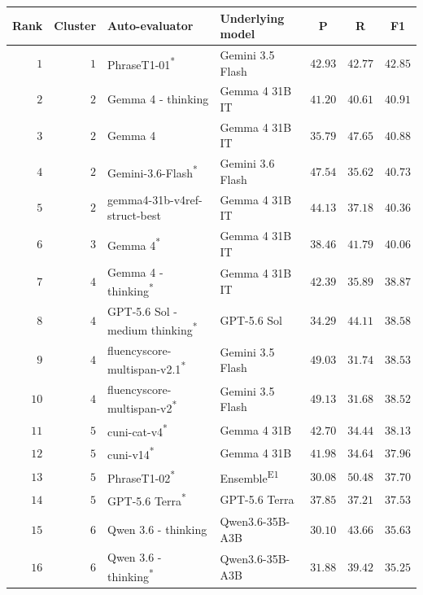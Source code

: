\begin{table}[t]
\centering
\small
\begin{tabular}{rrllrrr}
\toprule
\multicolumn{1}{c}{Rank} & \multicolumn{1}{c}{Cluster} & Auto-evaluator & Underlying model & \multicolumn{1}{c}{P} & \multicolumn{1}{c}{R} & \multicolumn{1}{c}{F1} \\
\midrule
$1$ & $1$ & PhraseT1-01\textsuperscript{*} & Gemini 3.5 Flash & $42.93$ & $42.77$ & $42.85$ \\
\rowcolor{black!15} $2$ & $2$ & Gemma 4 - thinking & Gemma 4 31B IT & $41.20$ & $40.61$ & $40.91$ \\
\rowcolor{black!15} $3$ & $2$ & Gemma 4 & Gemma 4 31B IT & $35.79$ & $47.65$ & $40.88$ \\
\rowcolor{black!15} $4$ & $2$ & Gemini-3.6-Flash\textsuperscript{*} & Gemini 3.6 Flash & $47.54$ & $35.62$ & $40.73$ \\
$5$ & $2$ & gemma4-31b-v4ref-struct-best & Gemma 4 31B IT & $44.13$ & $37.18$ & $40.36$ \\
\rowcolor{black!15} $6$ & $3$ & Gemma 4\textsuperscript{*} & Gemma 4 31B IT & $38.46$ & $41.79$ & $40.06$ \\
\rowcolor{black!15} $7$ & $4$ & Gemma 4 - thinking\textsuperscript{*} & Gemma 4 31B IT & $42.39$ & $35.89$ & $38.87$ \\
\rowcolor{black!15} $8$ & $4$ & GPT-5.6 Sol - medium thinking\textsuperscript{*} & GPT-5.6 Sol & $34.29$ & $44.11$ & $38.58$ \\
$9$ & $4$ & fluencyscore-multispan-v2.1\textsuperscript{*} & Gemini 3.5 Flash & $49.03$ & $31.74$ & $38.53$ \\
$10$ & $4$ & fluencyscore-multispan-v2\textsuperscript{*} & Gemini 3.5 Flash & $49.13$ & $31.68$ & $38.52$ \\
$11$ & $5$ & cuni-cat-v4\textsuperscript{*} & Gemma 4 31B & $42.70$ & $34.44$ & $38.13$ \\
$12$ & $5$ & cuni-v14\textsuperscript{*} & Gemma 4 31B & $41.98$ & $34.64$ & $37.96$ \\
$13$ & $5$ & PhraseT1-02\textsuperscript{*} & Ensemble\textsuperscript{E1} & $30.08$ & $50.48$ & $37.70$ \\
\rowcolor{black!15} $14$ & $5$ & GPT-5.6 Terra\textsuperscript{*} & GPT-5.6 Terra & $37.85$ & $37.21$ & $37.53$ \\
\rowcolor{black!15} $15$ & $6$ & Qwen 3.6 - thinking & Qwen3.6-35B-A3B & $30.10$ & $43.66$ & $35.63$ \\
\rowcolor{black!15} $16$ & $6$ & Qwen 3.6 - thinking\textsuperscript{*} & Qwen3.6-35B-A3B & $31.88$ & $39.42$ & $35.25$ \\

\end{tabular}
\end{table}
